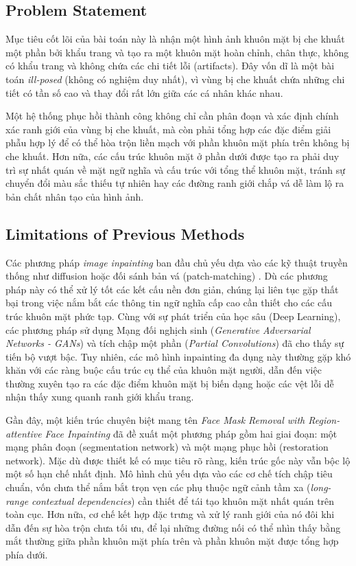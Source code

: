 \documentclass{ipgpmaster}
\begin{document}
\subsection{Problem Statement}
Mục tiêu cốt lõi của bài toán này là nhận một hình ảnh khuôn mặt bị che khuất một phần bởi khẩu trang và tạo ra một khuôn mặt hoàn chỉnh, chân thực, không có khẩu trang và không chứa các chi tiết lỗi (artifacts). Đây vốn dĩ là một bài toán \textit{ill-posed} (không có nghiệm duy nhất), vì vùng bị che khuất chứa những chi tiết có tần số cao và thay đổi rất lớn giữa các cá nhân khác nhau. 

Một hệ thống phục hồi thành công không chỉ cần phân đoạn và xác định chính xác ranh giới của vùng bị che khuất, mà còn phải tổng hợp các đặc điểm giải phẫu hợp lý để có thể hòa trộn liền mạch với phần khuôn mặt phía trên không bị che khuất. Hơn nữa, các cấu trúc khuôn mặt ở phần dưới được tạo ra phải duy trì sự nhất quán về mặt ngữ nghĩa và cấu trúc với tổng thể khuôn mặt, tránh sự chuyển đổi màu sắc thiếu tự nhiên hay các đường ranh giới chắp vá dễ làm lộ ra bản chất nhân tạo của hình ảnh.

\subsection{Limitations of Previous Methods}
Các phương pháp \textit{image inpainting} ban đầu chủ yếu dựa vào các kỹ thuật truyền thống như diffusion hoặc đối sánh bản vá (patch-matching) \cite{criminisi2004region}. Dù các phương pháp này có thể xử lý tốt các kết cấu nền đơn giản, chúng lại liên tục gặp thất bại trong việc nắm bắt các thông tin ngữ nghĩa cấp cao cần thiết cho các cấu trúc khuôn mặt phức tạp. Cùng với sự phát triển của học sâu (Deep Learning), các phương pháp sử dụng Mạng đối nghịch sinh (\textit{Generative Adversarial Networks - GANs}) \cite{goodfellow2014generative} và tích chập một phần (\textit{Partial Convolutions}) \cite{liu2018image} đã cho thấy sự tiến bộ vượt bậc. Tuy nhiên, các mô hình inpainting đa dụng này thường gặp khó khăn với các ràng buộc cấu trúc cụ thể của khuôn mặt người, dẫn đến việc thường xuyên tạo ra các đặc điểm khuôn mặt bị biến dạng hoặc các vệt lỗi dễ nhận thấy xung quanh ranh giới khẩu trang.

Gần đây, một kiến trúc chuyên biệt mang tên \textit{Face Mask Removal with Region-attentive Face Inpainting} \cite{yang2024face} đã đề xuất một phương pháp gồm hai giai đoạn: một mạng phân đoạn (segmentation network) và một mạng phục hồi (restoration network). Mặc dù được thiết kế có mục tiêu rõ ràng, kiến trúc gốc này vẫn bộc lộ một số hạn chế nhất định. Mô hình chủ yếu dựa vào các cơ chế tích chập tiêu chuẩn, vốn chưa thể nắm bắt trọn vẹn các phụ thuộc ngữ cảnh tầm xa (\textit{long-range contextual dependencies}) cần thiết để tái tạo khuôn mặt nhất quán trên toàn cục. Hơn nữa, cơ chế kết hợp đặc trưng và xử lý ranh giới của nó đôi khi dẫn đến sự hòa trộn chưa tối ưu, để lại những đường nối có thể nhìn thấy bằng mắt thường giữa phần khuôn mặt phía trên và phần khuôn mặt được tổng hợp phía dưới.
\end{document}
